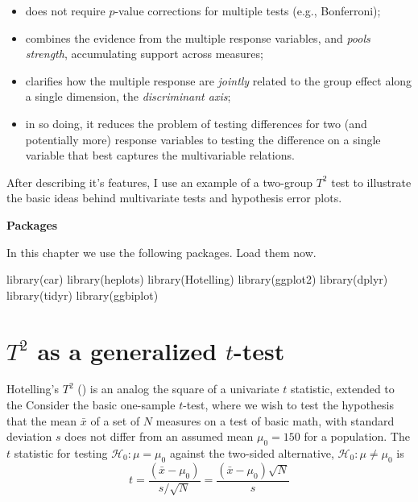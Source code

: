 \documentclass[
  letterpaper,
  10pt,
  krantz2]{krantz}
\makeatletter
\newenvironment{Shaded}{\begin{snugshade}}{\end{snugshade}}
\newcommand{\FunctionTok}[1]{\textcolor[rgb]{0.28,0.35,0.67}{#1}}
\newcommand{\NormalTok}[1]{\textcolor[rgb]{0.00,0.23,0.31}{#1}}
\providecommand{\tightlist}{%
  \setlength{\itemsep}{0pt}\setlength{\parskip}{0pt}}\usepackage{longtable,booktabs,array}
\newenvironment{kframe}{%
  \medskip{}
  \setlength{\fboxsep}{.8em}
  \def\at@end@of@kframe{}%
  \ifinner\ifhmode%
  \def\at@end@of@kframe{\end{minipage}}%
  \begin{minipage}{\columnwidth}%
  \fi\fi%
  \def\FrameCommand##1{\hskip\@totalleftmargin \hskip-\fboxsep
  \colorbox{shadecolor}{##1}\hskip-\fboxsep
      \hskip-\linewidth \hskip-\@totalleftmargin \hskip\columnwidth}%
  \MakeFramed {\advance\hsize-\width
    \@totalleftmargin\z@ \linewidth\hsize
    \@setminipage}}%
{\par\unskip\endMakeFramed%
  \at@end@of@kframe}
\renewenvironment{Shaded}{\begin{kframe}}{\end{kframe}}
\makeatother
\begin{document}
\begin{itemize}
\tightlist
\item
  does not require \(p\)-value corrections for multiple tests (e.g.,
  Bonferroni);
\item
  combines the evidence from the multiple response variables, and
  \emph{pools strength}, accumulating support across measures;
\item
  clarifies how the multiple response are \emph{jointly} related to the
  group effect along a single dimension, the \emph{discriminant axis};
\item
  in so doing, it reduces the problem of testing differences for two
  (and potentially more) response variables to testing the difference on
  a single variable that best captures the multivariable relations.
\end{itemize}

After describing it's features, I use an example of a two-group \(T^2\)
test to illustrate the basic ideas behind multivariate tests and
hypothesis error plots.

\textbf{Packages}

In this chapter we use the following packages. Load them now.

\begin{Shaded}
\begin{Highlighting}[]
\FunctionTok{library}\NormalTok{(car)}
\FunctionTok{library}\NormalTok{(heplots)}
\FunctionTok{library}\NormalTok{(Hotelling)}
\FunctionTok{library}\NormalTok{(ggplot2)}
\FunctionTok{library}\NormalTok{(dplyr)}
\FunctionTok{library}\NormalTok{(tidyr)}
\FunctionTok{library}\NormalTok{(ggbiplot)}
\end{Highlighting}
\end{Shaded}

\section{\texorpdfstring{\(T^2\) as a generalized
\(t\)-test}{T\^{}2 as a generalized t-test}}\label{t2-as-a-generalized-t-test}

Hotelling's \(T^2\) () is
an analog the square of a univariate \(t\) statistic, extended to the
Consider the basic one-sample \(t\)-test, where we wish to test the
hypothesis that the mean \(\bar{x}\) of a set of \(N\) measures on a
test of basic math, with standard deviation \(s\) does not differ from
an assumed mean \(\mu_0 = 150\) for a population. The \(t\) statistic
for testing \(\mathcal{H}_0 : \mu = \mu_0\) against the two-sided
alternative, \(\mathcal{H}_0 : \mu \ne \mu_0\) is \[
t = \frac{(\bar{x} - \mu_0)}{s / \sqrt{N}} = \frac{(\bar{x} - \mu_0)\sqrt{N}}{s}
\]
\end{document}
